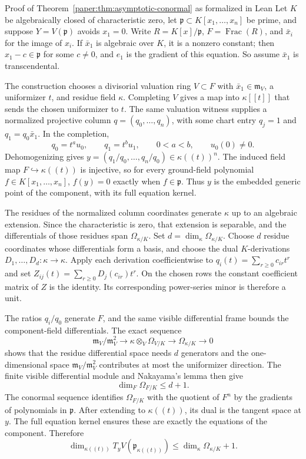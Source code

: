 \documentclass[11pt]{amsart}
\numberwithin{equation}{section}
\theoremstyle{plain}
\theoremstyle{remark}
\begin{document}
\begin{AIaddition}{Proof of Theorem~\ref{paper:thm:asymptotic-conormal} as formalized in Lean}
Let $K$ be algebraically closed of characteristic zero, let $\mathfrak p\subset
K[x_1,\dots,x_n]$ be prime, and suppose $Y=V(\mathfrak p)$ avoids $x_1=0$.
Write $R=K[x]/\mathfrak p$, $F=\operatorname{Frac}(R)$, and $\bar x_i$ for the
image of $x_i$. If $\bar x_1$ is algebraic over $K$, it is a nonzero constant;
then $x_1-c\in\mathfrak p$ for some $c\ne0$, and $e_1$ is the gradient of
this equation. So assume $\bar x_1$ is transcendental.

The construction chooses a divisorial valuation ring $V\subset F$ with
$\bar x_1\in\mathfrak m_V$, a uniformizer $t$, and residue field $\kappa$.
Completing $V$ gives a map into $\kappa[[t]]$ that sends the chosen uniformizer
to $t$. The same valuation witness supplies a normalized projective column
$q=(q_0,\dots,q_n)$, with some chart entry $q_j=1$ and
$q_1=q_0\bar x_1$. In the completion,
\[
 q_0=t^a u_0,\qquad q_1=t^b u_1,
 \qquad 0<a<b,\qquad u_0(0)\ne0.
\]
Dehomogenizing gives $y=(q_1/q_0,\dots,q_n/q_0)\in\kappa((t))^n$.
The induced field map $F\hookrightarrow\kappa((t))$ is injective, so for every
ground-field polynomial $f\in K[x_1,\dots,x_n]$, $f(y)=0$ exactly when
$f\in\mathfrak p$. Thus $y$ is the embedded generic point of the component,
with its full equation kernel.

The residues of the normalized column coordinates generate $\kappa$ up to an
algebraic extension. Since the characteristic is zero, that extension is
separable, and the differentials of those residues span $\Omega_{\kappa/K}$.
Set $d=\dim_\kappa\Omega_{\kappa/K}$. Choose $d$ residue coordinates whose
differentials form a basis, and choose the dual $K$-derivations
$D_1,\dots,D_d:\kappa\to\kappa$. Apply each derivation coefficientwise to
$q_i(t)=\sum_{r\ge0}c_{ir}t^r$ and set
$Z_{ij}(t)=\sum_{r\ge0}D_j(c_{ir})t^r$. On the chosen rows the constant
coefficient matrix of $Z$ is the identity. Its corresponding power-series
minor is therefore a unit.

The ratios $q_i/q_0$ generate $F$, and the same visible differential frame
bounds the component-field differentials.
The exact sequence
\[
 \mathfrak m_V/\mathfrak m_V^2\longrightarrow
 \kappa\otimes_V\Omega_{V/K}\longrightarrow\Omega_{\kappa/K}\longrightarrow0
\]
shows that the residue differential space needs $d$ generators and the
one-dimensional space $\mathfrak m_V/\mathfrak m_V^2$ contributes at most the
uniformizer direction. The finite visible differential module and Nakayama's
lemma then give
\[
 \dim_F\Omega_{F/K}\le d+1.
\]
The conormal sequence identifies $\Omega_{F/K}$ with the quotient of $F^n$
by the gradients of polynomials in $\mathfrak p$. After extending to
$\kappa((t))$, its dual is the tangent space at $y$. The full equation kernel
ensures these are exactly the equations of the component. Therefore
\[
\dim_{\kappa((t))}T_yV(\mathfrak p_{\kappa((t))})
 \le \dim_\kappa\Omega_{\kappa/K}+1.
\]


\end{AIaddition}
\end{document}

